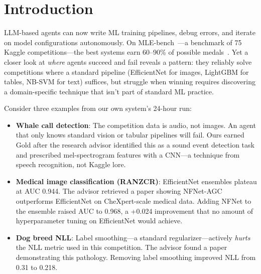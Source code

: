 \documentclass{article}
\begin{document}
\section{Introduction}
\label{sec:intro}

LLM-based agents can now write ML training pipelines, debug errors, and iterate on model configurations autonomously. On MLE-bench~\citep{chan2024mlebench}---a benchmark of 75 Kaggle competitions---the best systems earn 60--90\% of possible medals~\citep{famouagent2025,aibuilai2025}. Yet a closer look at \emph{where} agents succeed and fail reveals a pattern: they reliably solve competitions where a standard pipeline (EfficientNet for images, LightGBM for tables, NB-SVM for text) suffices, but struggle when winning requires discovering a domain-specific technique that isn't part of standard ML practice.

Consider three examples from our own system's 24-hour run:
\begin{itemize}[leftmargin=1.5em,itemsep=2pt]
    \item \textbf{Whale call detection}: The competition data is audio, not images. An agent that only knows standard vision or tabular pipelines will fail. Ours earned Gold after the research advisor identified this as a sound event detection task and prescribed mel-spectrogram features with a CNN---a technique from speech recognition, not Kaggle lore.
    \item \textbf{Medical image classification (RANZCR)}: EfficientNet ensembles plateau at AUC 0.944. The advisor retrieved a paper showing NFNet-AGC~\citep{brock2021nfnet} outperforms EfficientNet on CheXpert-scale medical data. Adding NFNet to the ensemble raised AUC to 0.968, a +0.024 improvement that no amount of hyperparameter tuning on EfficientNet would achieve.
    \item \textbf{Dog breed NLL}: Label smoothing---a standard regularizer---actively \emph{hurts} the NLL metric used in this competition. The advisor found a paper~\citep{labelsmoothing2025} demonstrating this pathology. Removing label smoothing improved NLL from 0.31 to 0.218.
\end{itemize}
\end{document}
